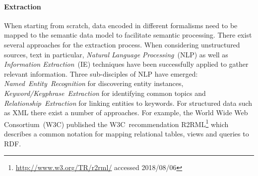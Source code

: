 \paragraph{Extraction} When starting from scratch, data encoded in different formalisms need to be mapped to the semantic data model to facilitate semantic processing. 
There exist several approaches for the extraction process. When considering unstructured sources, text in particular, \emph{Natural Language Processing}~(NLP) as well as \emph{Information Extraction}~(IE) techniques have been successfully applied to gather relevant information. Three sub-disciples of NLP have emerged: \emph{Named~Entity~Recognition} for discovering entity instances, \emph{Keyword/Keyphrase~Extraction} for identifying common topics and \emph{Relationship~Extraction} for linking entities to keywords. For structured data such as XML there exist a number of approaches. For example, the World Wide Web Consortium~(W3C) published the W3C~recommendation R2RML\footnote{\url{http://www.w3.org/TR/r2rml/} accessed 2018/08/06} which describes a common notation for mapping relational tables, views and queries to RDF. 

